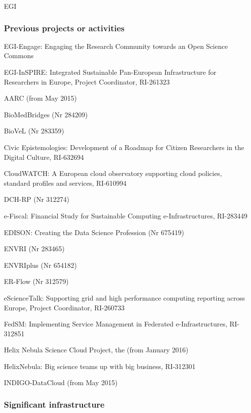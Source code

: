 \begin{sitedescription}{EGI}
\subsubsection*{Previous projects or activities}

\begin{compactenum}
\item EGI-Engage: Engaging the Research Community towards an Open Science Commons
\item EGI-InSPIRE: Integrated Sustainable Pan-European Infrastructure for Researchers in Europe, Project Coordinator, RI-261323
\item AARC (from May 2015)
\item BioMedBridges (Nr 284209)
\item BioVeL (Nr 283359)
\item Civic Epistemologies: Development of a Roadmap for Citizen Researchers in the Digital Culture, RI-632694
\item CloudWATCH: A European cloud observatory supporting cloud policies, standard profiles and services, RI-610994
\item DCH-RP (Nr 312274)
\item e-Fiscal: Financial Study for Sustainable Computing e-Infrastructures, RI-283449
\item EDISON: Creating the Data Science Profession (Nr 675419)
\item ENVRI (Nr 283465)
\item ENVRIplus (Nr 654182)
\item ER-Flow (Nr 312579)
\item eScienceTalk: Supporting grid and high performance computing reporting across Europe, Project Coordinator, RI-260733
\item FedSM: Implementing Service Management in Federated e-Infrastructures, RI-312851
\item Helix Nebula Science Cloud Project, the (from January 2016)
\item HelixNebula: Big science teams up with big business, RI-312301
\item INDIGO-DataCloud (from May 2015)
\end{compactenum}

\subsubsection*{Significant infrastructure}

\end{sitedescription}
